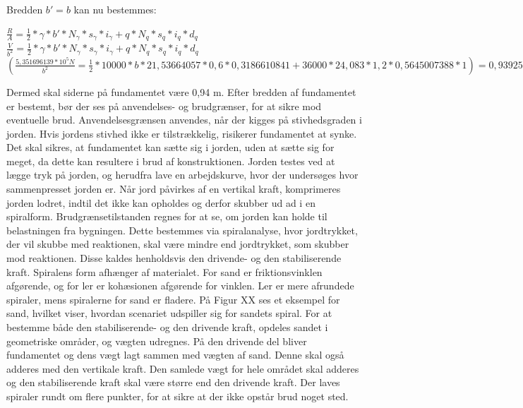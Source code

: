 Bredden $b'=b$ kan nu bestemmes: 
\begin{center}
	$\frac{R}{A}=\frac{1}{2}*\gamma*b'*N_\gamma*s_\gamma*i_\gamma+q*N_q*s_q*i_q*d_q$
	$\frac{V}{b^2}=\frac{1}{2}*\gamma*b'*N_\gamma*s_\gamma*i_\gamma+q*N_q*s_q*i_q*d_q$
	$(\frac{5,\!351696139*10^5N}{b^2}=\frac{1}{2}*10000*b*21,\!53664057*0,\!6*0,\!3186610841+36000*24,\!083*1,\!2*0,\!5645007388*1)=0,\!9392506518$
\end{center}

Dermed skal siderne på fundamentet være 0,94 m.
\newline
\newline
Efter bredden af fundamentet er bestemt, bør der ses på anvendelses- og brudgrænser, for at sikre mod eventuelle brud. Anvendelsesgrænsen anvendes, når der kigges på stivhedsgraden i jorden. Hvis jordens stivhed ikke er tilstrækkelig, risikerer fundamentet at synke. Det skal sikres, at fundamentet kan sætte sig i jorden, uden at sætte sig for meget, da dette kan resultere i brud af konstruktionen.
\newline \indent{     }  Jorden testes ved at lægge tryk på jorden, og herudfra lave en arbejdskurve, hvor der undersøges hvor sammenpresset jorden er. 
\newline
\newline
Når jord påvirkes af en vertikal kraft, komprimeres jorden lodret, indtil det ikke kan opholdes og derfor skubber ud ad i en spiralform. Brudgrænsetilstanden regnes for at se, om jorden kan holde til belastningen fra bygningen. Dette bestemmes via spiralanalyse, hvor jordtrykket, der vil skubbe med reaktionen, skal være mindre end jordtrykket, som skubber mod reaktionen. Disse kaldes henholdsvis den drivende- og den stabiliserende kraft. Spiralens form afhænger af materialet. For sand er friktionsvinklen afgørende, og for ler er kohæsionen afgørende for vinklen. Ler er mere afrundede spiraler, mens spiralerne for sand er fladere. 
\newline \indent{     }  På Figur XX ses et eksempel for sand, hvilket viser, hvordan scenariet udspiller sig for sandets spiral. For at bestemme både den stabiliserende- og den drivende kraft, opdeles sandet i geometriske områder, og vægten udregnes. På den drivende del bliver fundamentet og dens vægt lagt sammen med vægten af sand. Denne skal også adderes med den vertikale kraft. Den samlede vægt for hele området skal adderes og den stabiliserende kraft skal være større end den drivende kraft. Der laves spiraler rundt om flere punkter, for at sikre at der ikke opstår brud noget sted. 

